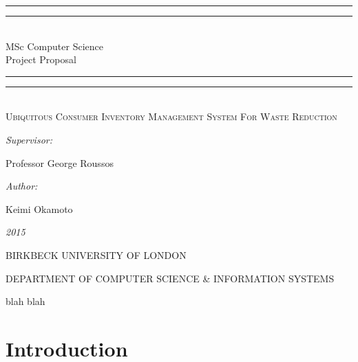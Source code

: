 \documentclass[a4paper, 11pt]{article}
\newlength{\drop}
\begin{document}
  \begin{titlepage}
    \textheight
    \centering
    \vspace*{\baselineskip}
    \rule{\textwidth}{1.6pt}\vspace*{-\baselineskip}\vspace*{2pt}
    \rule{\textwidth}{0.4pt}\\[\baselineskip]
    {\Large{MSc Computer Science\\[0.3\baselineskip] }}
    {\huge{Project Proposal\\[0.3\baselineskip] }}
	
    \rule{\textwidth}{0.4pt}\vspace*{-\baselineskip}\vspace{3.2pt}
    \rule{\textwidth}{1.6pt}
    \\[\baselineskip]
    \scshape
    {\Large Ubiquitous Consumer Inventory Management System For Waste Reduction\\}
    \vspace*{2\baselineskip}
    {\normalsize\emph{Supervisor: }{\large Professor George Roussos\par}}
    {\normalsize\emph{Author: }{\large Keimi Okamoto\par}}
    
    {\itshape 2015}
    \vfill
    {\large BIRKBECK UNIVERSITY OF LONDON\par}
{\footnotesize DEPARTMENT OF COMPUTER SCIENCE \& INFORMATION SYSTEMS}\par
  \end{titlepage}
  
\tableofcontents
\clearpage

blah blah
\clearpage

\section{Introduction}
\end{document}
